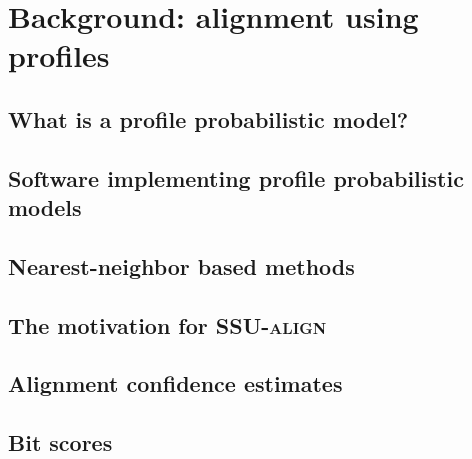 \section{Background: alignment using profiles}

\subsection{What is a profile probabilistic model?}

\begin{comment}
Profile probabilistic models are statistical models of a sequence
family that include \emph{position-specific} information about which
residues are 

For our purposes here it is 

Examples include profile hidden Markov models, commonly used
for protein sequence homology search and implemented in some widely
used software packages such as \software{HMMER} (CITE). 
\end{comment}

\subsection{Software implementing profile probabilistic models}

\subsection{Nearest-neighbor based methods}

\subsection{The motivation for \textsc{SSU-align}}

\subsection{Alignment confidence estimates}

\subsection{Bit scores}

